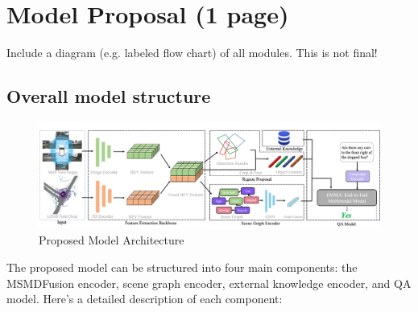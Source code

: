 \documentclass{article} %
\begin{document}
	\clearpage
	\section{Model Proposal (1 page)}
	Include a diagram (e.g. labeled flow chart) of all modules.  This is not final!
	
	\subsection{ Overall model structure }
	
	\begin{figure}[H]
		\centering
		\includegraphics[width=\linewidth]{Figures/framework.png}
		\caption{Proposed Model Architecture}
		\label{fig:enter-label}
	\end{figure}
	
	The proposed model can be structured into four main components: the MSMDFusion encoder, scene graph encoder, external knowledge encoder, and QA model. Here's a detailed description of each component:
	
\end{document}
